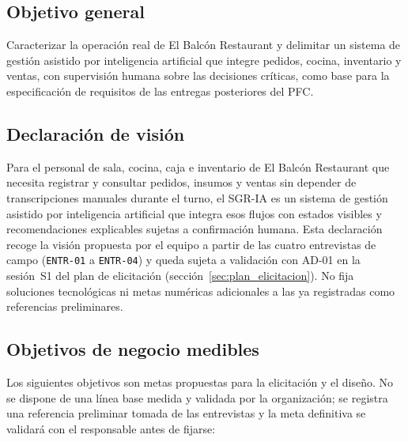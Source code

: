 \subsection{Objetivo general}
Caracterizar la operaci\'on real de El Balcón Restaurant y delimitar un sistema de gesti\'on asistido por inteligencia artificial que integre pedidos, cocina, inventario y ventas, con supervisi\'on humana sobre las decisiones cr\'iticas, como base para la especificaci\'on de requisitos de las entregas posteriores del PFC.

\subsection{Declaraci\'on de visi\'on}
Para el personal de sala, cocina, caja e inventario de El Balcón Restaurant que necesita registrar y consultar pedidos, insumos y ventas sin depender de transcripciones manuales durante el turno, el SGR-IA es un sistema de gesti\'on asistido por inteligencia artificial que integra esos flujos con estados visibles y recomendaciones explicables sujetas a confirmaci\'on humana. Esta declaraci\'on recoge la visi\'on propuesta por el equipo a partir de las cuatro entrevistas de campo (\texttt{ENTR-01} a \texttt{ENTR-04}) y queda sujeta a validaci\'on con AD-01 en la sesi\'on~S1 del plan de elicitaci\'on (secci\'on~\ref{sec:plan_elicitacion}). No fija soluciones tecnol\'ogicas ni metas num\'ericas adicionales a las ya registradas como referencias preliminares.

\subsection{Objetivos de negocio medibles}
Los siguientes objetivos son metas propuestas para la elicitaci\'on y el dise\~no. No se dispone de una l\'inea base medida y validada por la organizaci\'on; se registra una referencia preliminar tomada de las entrevistas y la meta definitiva se validar\'a con el responsable antes de fijarse:


